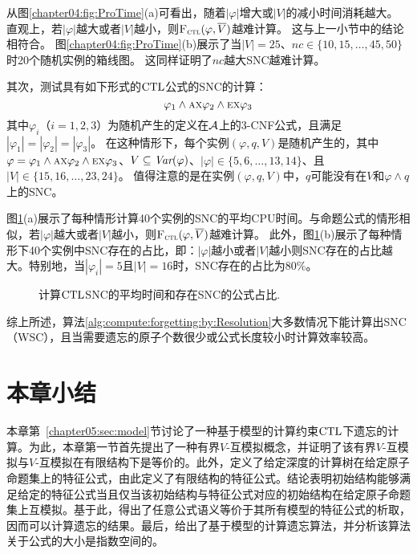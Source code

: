 从图\ref{chapter04:fig:ProTime}(a)可看出，随着$|\varphi|$增大或$|V|$的减小时间消耗越大。
直观上，若$|\varphi|$越大或者$|V|$越小，则${\textsc{F}_{\textsc{ctl}}}(\varphi, \overline{V})$越难计算。
这与上一小节中的结论相符合。
图\ref{chapter04:fig:ProTime}(b)展示了当$|V|= 25$、$nc\in \{10,15,\dots, 45, 50\}$时20个随机实例的箱线图。
这同样证明了$nc$越大SNC越难计算。


其次，测试具有如下形式的$\textrm{CTL}$公式的SNC的计算：
$$\varphi_1 \wedge \textsc{a} \textsc{x} \varphi_2 \wedge \textsc{e}\textsc{x} \varphi_3$$
其中$\varphi_i$（$i=1,2,3$）为随机产生的定义在${\cal A}$上的3-CNF公式，且满足$|\varphi_1|=|\varphi_2|=|\varphi_3|$。
在这种情形下，每个实例$(\varphi, q, V)$是随机产生的，其中$\varphi=\varphi_1 \wedge \textsc{a} \textsc{x} \varphi_2 \wedge \textsc{e}\textsc{x} \varphi_3$、$V\subseteq \textit{Var}(\varphi)$、$|\varphi|\in \{5,6,\dots, 13,14\}$、且$|V|\in \{15,16,\dots, 23,24\}$。
值得注意的是在实例$(\varphi, q, V)$中，$q$可能没有在$V$和$\varphi\wedge q$上的SNC。

图\ref{chapter04:fig:CtlTime}(a)展示了每种情形计算40个实例的SNC的平均CPU时间。与命题公式的情形相似，若$|\varphi|$越大或者$|V|$越小，则${\textsc{F}_{\textsc{ctl}}}(\varphi, \overline{V})$越难计算。
此外，图\ref{chapter04:fig:CtlTime}(b)展示了每种情形下40个实例中SNC存在的占比，即：$|\varphi|$越小或者$|V|$越小则SNC存在的占比越大。特别地，当$|\varphi_i|=5$且$|V|=16$时，SNC存在的占比为80\%。



\begin{figure*}[!htb]
	\centering
	\caption{计算$\textrm{CTL}$SNC的平均时间和存在SNC的公式占比.}
	\label{chapter04:fig:CtlTime}
\end{figure*}

综上所述，算法\ref{alg:compute:forgetting:by:Resolution}大多数情况下能计算出SNC（WSC），且当需要遗忘的原子个数很少或公式长度较小时计算效率较高。


\section{本章小结} 
本章第~\ref{chapter05:sec:model}节讨论了一种基于模型的计算约束$\textrm{CTL}$下遗忘的计算。为此，本章第一节首先提出了一种有界$V$-互模拟概念，并证明了该有界$V$-互模拟与$V$-互模拟在有限结构下是等价的。此外，定义了给定深度的计算树在给定原子命题集上的特征公式，由此定义了有限结构的特征公式。结论表明初始结构能够满足给定的特征公式当且仅当该初始结构与特征公式对应的初始结构在给定原子命题集上互模拟。基于此，得出了任意公式语义等价于其所有模型的特征公式的析取，因而可以计算遗忘的结果。最后，给出了基于模型的计算遗忘算法，并分析该算法关于公式的大小是指数空间的。

